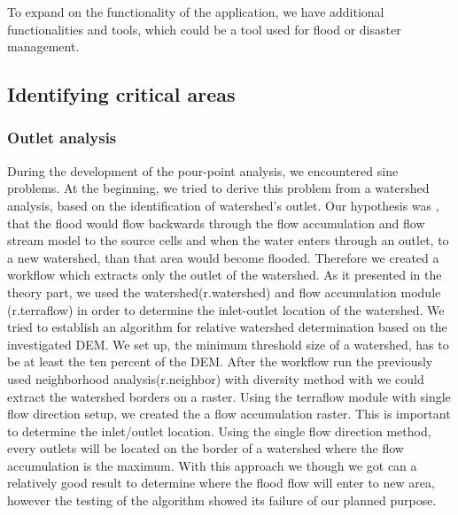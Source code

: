 To expand on the functionality of the application, we have additional functionalities and tools, which could be a tool used for flood or disaster management. 

\subsection{Identifying critical areas}
\subsubsection{Outlet analysis}
During the development of the pour-point analysis, we encountered sine problems. At the beginning, we tried to derive this problem from a watershed analysis, based on the identification of watershed's outlet. Our hypothesis was , that the flood  would flow backwards through the flow accumulation and flow stream model to the source cells and when the water enters through an outlet, to a new watershed, than that area would become flooded. Therefore we created a workflow which extracts only the outlet of the watershed. As it presented in the theory part, we used the watershed(r.watershed) and flow accumulation module (r.terraflow) in order to determine the inlet-outlet location of the watershed. We tried to establish an algorithm for relative watershed determination based on the investigated DEM. We set up, the minimum threshold size of a watershed, has to be at least the ten percent of the DEM. After the workflow run the previously used neighborhood analysis(r.neighbor) with diversity method with we could extract the watershed borders on a raster. Using the terraflow module with single flow direction setup, we created the a flow accumulation raster. This is important to determine the inlet/outlet location. Using the single flow direction method, every outlets will be located on the border of a watershed where the flow accumulation is the maximum. With this approach we though we got can a relatively good result to determine where the flood flow will enter to new area, however the testing of the algorithm showed its failure of our planned purpose.

